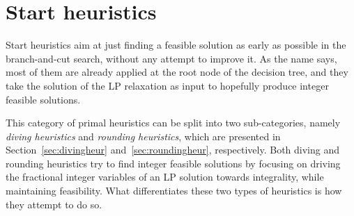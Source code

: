 \documentclass[a4paper,12pt,twoside]{scrbook}
\begin{document}
\section{Start heuristics} \label{sec:startheur}
Start heuristics aim at just finding a feasible solution as early as possible in the branch-and-cut search, without any attempt to improve it. As the name says, most of them are already applied at the root node of the decision tree, and they take the solution of the LP relaxation as input to hopefully produce integer feasible solutions. \par 
This category of primal heuristics can be split into two sub-categories, namely \textit{diving heuristics} and \textit{rounding heuristics}, which are presented in Section~\ref{sec:divingheur} and~\ref{sec:roundingheur}, respectively. Both diving and rounding heuristics try to find integer feasible solutions by focusing on driving the fractional integer variables of an LP solution towards integrality, while maintaining feasibility. What differentiates these two types of heuristics is how they attempt to do so.
\end{document}

